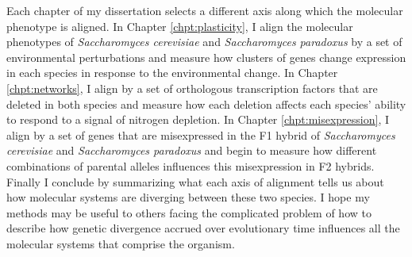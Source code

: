 Each chapter of my dissertation selects a different axis along which the molecular phenotype is aligned. In Chapter \ref{chpt:plasticity}, I align the molecular phenotypes of \textit{Saccharomyces cerevisiae} and \textit{Saccharomyces paradoxus} by a set of environmental perturbations and measure how clusters of genes change expression in each species in response to the environmental change. In Chapter \ref{chpt:networks}, I align by a set of orthologous transcription factors that are deleted in both species and measure how each deletion affects each species' ability to respond to a signal of nitrogen depletion. In Chapter \ref{chpt:misexpression}, I align by a set of genes that are misexpressed in the F1 hybrid of \textit{Saccharomyces cerevisiae} and \textit{Saccharomyces paradoxus} and begin to measure how different combinations of parental alleles influences this misexpression in F2 hybrids. Finally I conclude by summarizing what each axis of alignment tells us about how molecular systems are diverging between these two species. I hope my methods may be useful to others facing the complicated problem of how to describe how genetic divergence accrued over evolutionary time influences all the molecular systems that comprise the organism.


